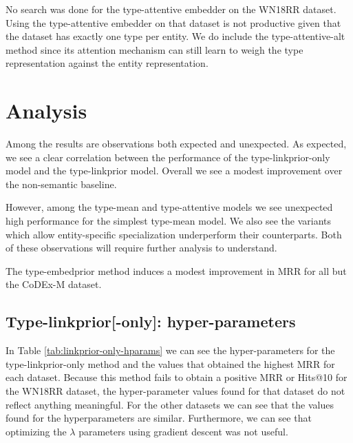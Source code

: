 No search was done for the type-attentive embedder on the WN18RR dataset. Using the type-attentive embedder on that dataset is not productive given that the dataset has exactly one type per entity. 
We do include the type-attentive-alt method since its attention mechanism can still learn to weigh the type representation against the entity representation.


\section{Analysis}
Among the results are observations both expected and unexpected.
As expected, we see a clear correlation between the performance of the type-linkprior-only model and the type-linkprior model.
Overall we see a modest improvement over the non-semantic baseline.

However, among the type-mean and type-attentive models we see unexpected high performance for the simplest type-mean model. We also see the variants which allow entity-specific specialization underperform their counterparts. Both of these observations will require further analysis to understand.

The type-embedprior method induces a modest improvement in MRR for all but the CoDEx-M dataset.





\subsection{Type-linkprior[-only]: hyper-parameters}

In Table \ref{tab:linkprior-only-hparams} we can see the hyper-parameters for the type-linkprior-only method and the values that obtained the highest MRR for each dataset. 
Because this method fails to obtain a positive MRR or Hits@10 for the WN18RR dataset, the hyper-parameter values found for that dataset do not reflect anything meaningful.
For the other datasets we can see that the values found for the hyperparameters are similar.
Furthermore, we can see that optimizing the $\lambda$ parameters using gradient descent was not useful.


